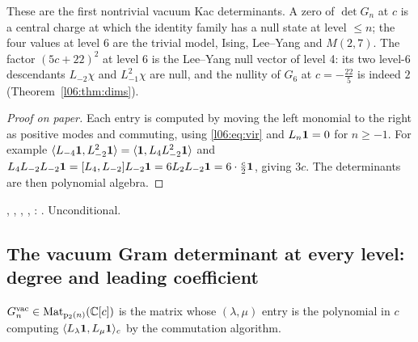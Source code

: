 \begin{physics}
These are the first nontrivial vacuum Kac determinants. A zero of $\det G_n$ at $c$ is a central charge
at which the identity family has a null state at level $\le n$; the four values at level 6 are the trivial
model, Ising, Lee--Yang and $M(2,7)$. The factor $(5c+22)^2$ at level 6 is the Lee--Yang null vector of
level 4: its two level-6 descendants $L_{-2}\chi$ and $L_{-1}^2\chi$ are null, and the nullity of $G_6$ at
$c = -\frac{22}5$ is indeed $2$ (Theorem~\ref{l06:thm:dims}).
\end{physics}

\begin{proof}[Proof on paper]
Each entry is computed by moving the left monomial to the right as positive modes and commuting, using
\eqref{l06:eq:vir} and $L_n\mathbf{1} = 0$ for $n\ge-1$. For example
$\langle L_{-4}\mathbf{1},L_{-2}^2\mathbf{1}\rangle = \langle \mathbf{1},L_4L_{-2}^2\mathbf{1}\rangle$ and
$L_4L_{-2}L_{-2}\mathbf{1} = [L_4,L_{-2}]L_{-2}\mathbf{1} = 6L_2L_{-2}\mathbf{1} = 6\cdot\frac c2\mathbf{1}$, giving
$3c$. The determinants are then polynomial algebra.
\end{proof}

\begin{status}
\allowbreak{}\allowbreak{}\allowbreak{}, , \allowbreak{}\allowbreak{}\allowbreak{},
, \allowbreak{}\allowbreak{}\allowbreak{}\allowbreak{}: \lean{[propext, Classical.}\allowbreak{}\allowbreak\lean{sound]}.
Unconditional.
\end{status}

\subsection{The vacuum Gram determinant at every level: degree and leading coefficient}

\begin{definition}\label{l06:def:partgram}
$G^{\mathrm{vac}}_n\in\mathrm{Mat}_{\mathrm{p}_{2}(n)}({\mathbb{C}}[c])$ is the matrix whose $(\lambda,\mu)$ entry is the
polynomial in $c$ computing $\langle L_\lambda\mathbf{1},L_\mu\mathbf{1}\rangle_c$ by the commutation algorithm.
\end{definition}

